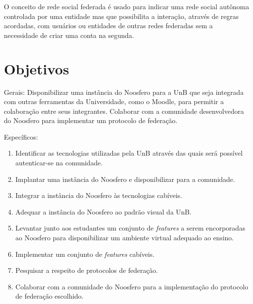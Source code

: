 O conceito de rede social federada é usado para indicar uma rede social autônoma controlada por uma entidade mas que possibilita a interação, através de regras acordadas, com usuários ou entidades de outras redes federadas sem a necessidade de criar uma conta na segunda.

\section{Objetivos}

Gerais: Disponibilizar uma instância do Noosfero para a UnB que seja integrada com outras ferramentas da Universidade, como o Moodle, para permitir a colaboração entre seus integrantes. Colaborar com a comunidade desenvolvedora do Noosfero para implementar um protocolo de federação.

Específicos:

\begin{enumerate}
	
\item Identificar as tecnologias utilizadas pela UnB através das quais será possível autenticar-se na comunidade.
\item Implantar uma instância do Noosfero e disponibilizar para a comunidade.
\item Integrar a instância do Noosfero às tecnologias cabíveis.
\item Adequar a instância do Noosfero ao padrão visual da UnB.
\item Levantar junto aos estudantes um conjunto de \textit{features} a serem encorporadas ao Noosfero para disponibilizar um ambiente virtual adequado ao ensino.
\item Implementar um conjunto de \textit{features} cabíveis.
\item Pesquisar a respeito de protocolos de federação.
\item Colaborar com a comunidade do Noosfero para a implementação do protocolo de federação escolhido.


\end{enumerate}

